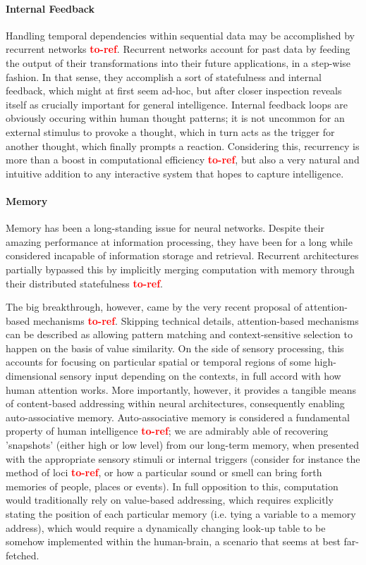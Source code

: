 \documentclass[]{article}
\newcommand\toref{\textcolor{red}{\bf{to-ref}}}
\begin{document}
\paragraph{Internal Feedback}
Handling temporal dependencies within sequential data may be accomplished by recurrent networks \toref . Recurrent networks account for past data by feeding the output of their transformations into their future applications, in a step-wise fashion. In that sense, they accomplish a sort of statefulness and internal feedback, which might at first seem ad-hoc, but after closer inspection reveals itself as crucially important for general intelligence. Internal feedback loops are obviously occuring within human thought patterns; it is not uncommon for an external stimulus to provoke a thought, which in turn acts as the trigger for another thought, which finally prompts a reaction. Considering this, recurrency is more than a boost in computational efficiency \toref , but also a very natural and intuitive addition to any interactive system that hopes to capture intelligence.

\paragraph{Memory}
Memory has been a long-standing issue for neural networks. Despite their amazing performance at information processing, they have been for a long while considered incapable of information storage and retrieval. Recurrent architectures partially bypassed this by implicitly merging computation with memory through their distributed statefulness \toref . 

The big breakthrough, however, came by the very recent proposal of attention-based mechanisms \toref . Skipping technical details, attention-based mechanisms can be described as allowing pattern matching and context-sensitive selection to happen on the basis of value similarity. On the side of sensory processing, this accounts for focusing on particular spatial or temporal regions of some high-dimensional sensory input depending on the contexts, in full accord with how human attention works. More importantly, however, it provides a tangible means of content-based addressing within neural architectures, consequently enabling auto-associative memory. Auto-associative memory is considered a fundamental property of human intelligence \toref ; we are admirably able of recovering 'snapshots' (either high or low level) from our long-term memory, when presented with the appropriate sensory stimuli or internal triggers (consider for instance the method of loci \toref , or how a particular sound or smell can bring forth memories of people, places or events). In full opposition to this, computation would traditionally rely on value-based addressing, which requires explicitly stating the position of each particular memory (i.e. tying a variable to a memory address), which would require a dynamically changing look-up table to be somehow implemented within the human-brain, a scenario that seems at best far-fetched.
\end{document}
